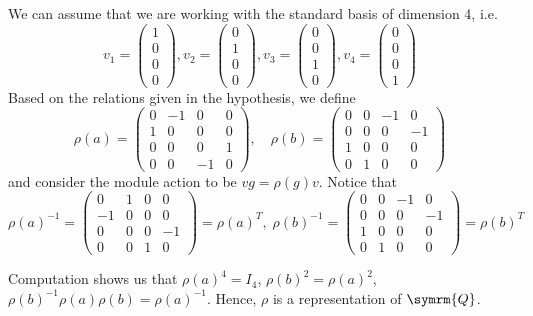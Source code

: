 \begin{solution}
We can assume that we are working with the standard basis of dimension 4, i.e.
\[
    v_1 = \begin{pmatrix}
        1 \\
        0 \\
        0 \\
        0
    \end{pmatrix},
    v_2 = \begin{pmatrix}
        0 \\
        1 \\
        0 \\
        0
    \end{pmatrix},
    v_3 = \begin{pmatrix}
        0 \\
        0 \\
        1 \\
        0
    \end{pmatrix},
    v_4 =
    \begin{pmatrix}
        0 \\
        0 \\
        0 \\
        1
    \end{pmatrix}
\]
Based on the relations given in the hypothesis, we define
\[
    \rho(a) = \begin{pmatrix}
        0 & -1 & 0 & 0 \\
        1 & 0 & 0 & 0 \\
        0 & 0 & 0 & 1 \\
        0 & 0 & -1 & 0
    \end{pmatrix},
    \quad
    \rho(b) = \begin{pmatrix}
        0 & 0 & -1 & 0 \\
        0 & 0 & 0 & -1 \\
        1 & 0 & 0 & 0 \\
        0 & 1 & 0 & 0
    \end{pmatrix}
\]
and consider the module action to be \(v g = \rho(g) v\). Notice that
\[
    \rho(a)^{-1} = \begin{pmatrix}
        0 & 1 & 0 & 0 \\
        -1 & 0 & 0 & 0 \\
        0 & 0 & 0 & -1 \\
        0 & 0 & 1 & 0
    \end{pmatrix} = \rho(a)^T,
    \;
    \rho(b)^{-1} = \begin{pmatrix}
        0 & 0 & -1 & 0 \\
        0 & 0 & 0 & -1 \\
        1 & 0 & 0 & 0 \\
        0 & 1 & 0 & 0
    \end{pmatrix} = \rho(b)^T
\]

Computation shows us that \(\rho(a)^4 = I_4\), \(\rho(b)^2 = \rho(a)^2\), \(\rho(b)^{-1} \rho(a) \rho(b) = \rho(a)^{-1}\). Hence, \(\rho\) is a representation of \(\symrm{Q}\).
\end{solution}

